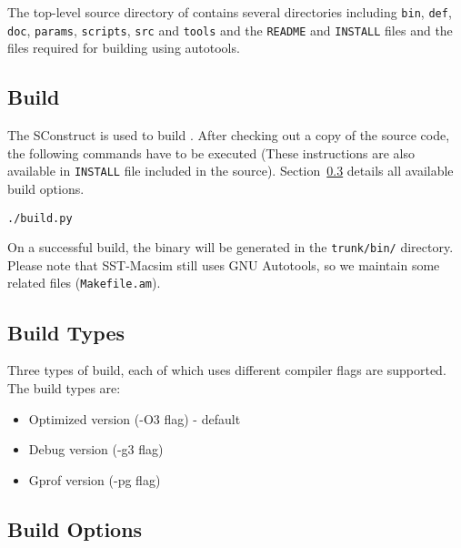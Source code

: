 \ignore
{
  The top-level source directory of \SIM contains several directories including
  \Verb+bin+, \Verb+def+, \Verb+doc+, \Verb+params+, \Verb+scripts+, \Verb+src+ and
  \Verb+tools+ and the \Verb+README+ and \Verb+INSTALL+ files and the files
  required for building \SIM using autotools.
}


\subsection{Build}

The SConstruct is used to build \SIM. After checking out a copy of the
\SIM source code, the following commands have to be executed (These
instructions are also available in \Verb+INSTALL+ file included in the
\SIM source). Section~\ref{sec:buildoption} details all available build options.


\begin{Verbatim}
./build.py
\end{Verbatim}

\noindent
On a successful build, the binary \bin will be generated in the
\Verb+trunk/bin/+ directory. Please note that SST-Macsim still uses
GNU Autotools, so we maintain some related files (\Verb+Makefile.am+).


\subsection{Build Types}

Three types of build, each of which uses different compiler flags are
supported. The build types are:

\begin{itemize}
  \item Optimized version (-O3 flag) - default
  \item Debug version (-g3 flag)
  \item Gprof version (-pg flag)
\end{itemize}


\subsection{Build Options}
\label{sec:buildoption}

